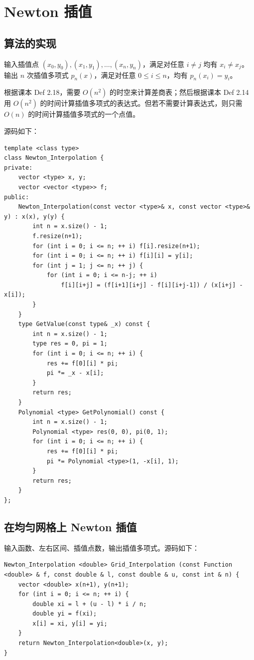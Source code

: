 \documentclass{ctexart}
\begin{document}
\section{Newton 插值}

\subsection{算法的实现}
输入插值点 $(x_0,y_0),(x_1,y_1),\dots,(x_n,y_n)$，满足对任意 $i\neq j$ 均有 $x_i\neq x_j$。输出 $n$ 次插值多项式 $p_n(x)$，满足对任意 $0\leq i\leq n$，均有 $p_n(x_i)=y_i$。

根据课本 Def 2.18，需要 $O(n^2)$ 的时空来计算差商表；然后根据课本 Def 2.14 用 $O(n^2)$ 的时间计算插值多项式的表达式。但若不需要计算表达式，则只需 $O(n)$ 的时间计算插值多项式的一个点值。

源码如下：

\begin{verbatim}
template <class type>
class Newton_Interpolation {
private:
    vector <type> x, y;
    vector <vector <type>> f;
public:
    Newton_Interpolation(const vector <type>& x, const vector <type>& y) : x(x), y(y) {
        int n = x.size() - 1;
        f.resize(n+1);
        for (int i = 0; i <= n; ++ i) f[i].resize(n+1);
        for (int i = 0; i <= n; ++ i) f[i][i] = y[i];
        for (int j = 1; j <= n; ++ j) {
            for (int i = 0; i <= n-j; ++ i)
                f[i][i+j] = (f[i+1][i+j] - f[i][i+j-1]) / (x[i+j] - x[i]);
        }
    }
    type GetValue(const type& _x) const {
        int n = x.size() - 1;
        type res = 0, pi = 1;
        for (int i = 0; i <= n; ++ i) {
            res += f[0][i] * pi;
            pi *= _x - x[i];
        }
        return res;
    }
    Polynomial <type> GetPolynomial() const {
        int n = x.size() - 1;
        Polynomial <type> res(0, 0), pi(0, 1);
        for (int i = 0; i <= n; ++ i) {
            res += f[0][i] * pi;
            pi *= Polynomial <type>(1, -x[i], 1);
        }
        return res;
    }
};
\end{verbatim}

\subsection{在均匀网格上 Newton 插值}
输入函数、左右区间、插值点数，输出插值多项式。源码如下：

\begin{verbatim}
Newton_Interpolation <double> Grid_Interpolation (const Function <double> & f, const double & l, const double & u, const int & n) {
    vector <double> x(n+1), y(n+1);
    for (int i = 0; i <= n; ++ i) {
        double xi = l + (u - l) * i / n;
        double yi = f(xi);
        x[i] = xi, y[i] = yi;
    }
    return Newton_Interpolation<double>(x, y);
}
\end{verbatim}
\end{document}

